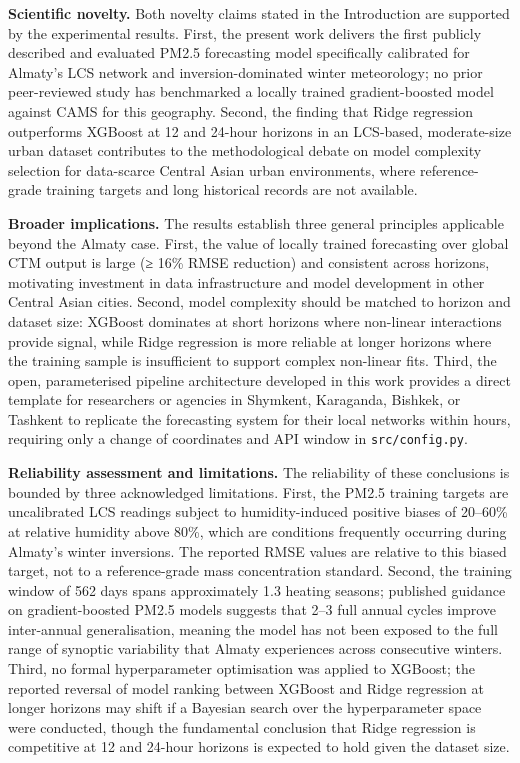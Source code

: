 \textbf{Scientific novelty.} Both novelty claims stated in the Introduction are supported by the experimental results. First, the present work delivers the first publicly described and evaluated PM2.5 forecasting model specifically calibrated for Almaty's LCS network and inversion-dominated winter meteorology; no prior peer-reviewed study has benchmarked a locally trained gradient-boosted model against CAMS for this geography. Second, the finding that Ridge regression outperforms XGBoost at 12 and 24-hour horizons in an LCS-based, moderate-size urban dataset contributes to the methodological debate on model complexity selection for data-scarce Central Asian urban environments, where reference-grade training targets and long historical records are not available.

\textbf{Broader implications.} The results establish three general principles applicable beyond the Almaty case. First, the value of locally trained forecasting over global CTM output is large (≥ 16\% RMSE reduction) and consistent across horizons, motivating investment in data infrastructure and model development in other Central Asian cities. Second, model complexity should be matched to horizon and dataset size: XGBoost dominates at short horizons where non-linear interactions provide signal, while Ridge regression is more reliable at longer horizons where the training sample is insufficient to support complex non-linear fits. Third, the open, parameterised pipeline architecture developed in this work provides a direct template for researchers or agencies in Shymkent, Karaganda, Bishkek, or Tashkent to replicate the forecasting system for their local networks within hours, requiring only a change of coordinates and API window in \texttt{src/config.py}.

\textbf{Reliability assessment and limitations.} The reliability of these conclusions is bounded by three acknowledged limitations. First, the PM2.5 training targets are uncalibrated LCS readings subject to humidity-induced positive biases of 20--60\% at relative humidity above 80\%, which are conditions frequently occurring during Almaty's winter inversions. The reported RMSE values are relative to this biased target, not to a reference-grade mass concentration standard. Second, the training window of 562 days spans approximately 1.3 heating seasons; published guidance on gradient-boosted PM2.5 models suggests that 2--3 full annual cycles improve inter-annual generalisation, meaning the model has not been exposed to the full range of synoptic variability that Almaty experiences across consecutive winters. Third, no formal hyperparameter optimisation was applied to XGBoost; the reported reversal of model ranking between XGBoost and Ridge regression at longer horizons may shift if a Bayesian search over the hyperparameter space were conducted, though the fundamental conclusion that Ridge regression is competitive at 12 and 24-hour horizons is expected to hold given the dataset size.

